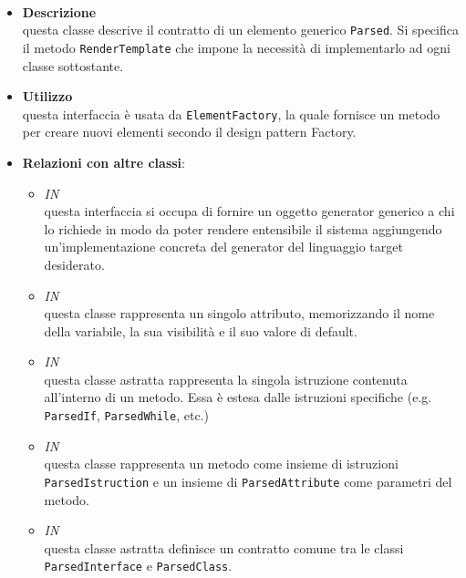\paragraph{}
\label{\nogloxy{SWEDesigner::Server::Project::ParsedElement}}
\begin{itemize}
\item \textbf{Descrizione}\\
questa classe descrive il contratto di un elemento generico \texttt{Parsed}. Si specifica il metodo \texttt{RenderTemplate} che impone la necessità di implementarlo ad ogni classe sottostante.
\item \textbf{Utilizzo}\\
questa interfaccia è usata da \texttt{ElementFactory}, la quale fornisce un metodo per creare nuovi elementi secondo il design pattern Factory. %
\item \textbf{Relazioni con altre classi}:
\begin{itemize}
\item \textit{IN} \hyperref[\nogloxy{SWEDesigner::Server::Generator::Generator}]{}\\
questa interfaccia si occupa di fornire un oggetto generator generico a chi lo richiede in modo da poter rendere entensibile il sistema aggiungendo un'implementazione concreta del generator del linguaggio target desiderato.
\item \textit{IN} \hyperref[\nogloxy{SWEDesigner::Server::Project::ParsedAttribute}]{}\\
questa classe rappresenta un singolo attributo, memorizzando il nome della variabile, la sua visibilità e il suo valore di default. 
\item \textit{IN} \hyperref[\nogloxy{SWEDesigner::Server::Project::ParsedInstruction}]{}\\
questa classe astratta rappresenta la singola istruzione contenuta all'interno di un metodo. Essa è estesa dalle istruzioni specifiche (e.g. \texttt{ParsedIf}, \texttt{ParsedWhile}, etc.)
\item \textit{IN} \hyperref[\nogloxy{SWEDesigner::Server::Project::ParsedMethod}]{}\\
questa classe rappresenta un metodo come insieme di istruzioni \texttt{ParsedIstruction} e un insieme di \texttt{ParsedAttribute} come parametri del metodo.
\item \textit{IN} \hyperref[\nogloxy{SWEDesigner::Server::Project::ParsedType}]{}\\
questa classe astratta definisce un contratto comune tra le classi \texttt{ParsedInterface} e \texttt{ParsedClass}. 
\end{itemize}
\end{itemize}


